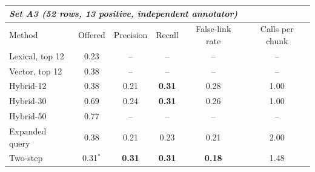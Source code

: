 \begin{table}[H]
\begin{tabular}{lccccc}
\multicolumn{6}{l}{\textit{Set A3 (52 rows, 13 positive, independent annotator)}}\\\midrule
Method & Offered & Precision & Recall & False-link rate & Calls per chunk\\\midrule
Lexical, top 12 & 0.23 & -- & -- & -- & --\\
Vector, top 12 & 0.38 & -- & -- & -- & --\\
Hybrid-12 & 0.38 & 0.21 & \textbf{0.31} & 0.28 & 1.00\\
Hybrid-30 & 0.69 & 0.24 & \textbf{0.31} & 0.26 & 1.00\\
Hybrid-50 & 0.77 & -- & -- & -- & --\\
Expanded query & 0.38 & 0.21 & 0.23 & 0.21 & 2.00\\
Two-step & 0.31$^{\ast}$ & \textbf{0.31} & \textbf{0.31} & \textbf{0.18} & 1.48\\
\bottomrule
\end{tabular}
\end{table}
